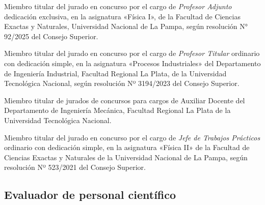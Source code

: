 \begin{timeline}
 Miembro titular del jurado en concurso por el cargo de \textit{Profesor Adjunto} dedicación exclusiva, en la asignatura «Física I», de la Facultad de Ciencias Exactas y Naturales, Universidad Nacional de La Pampa, según resolución N° 92/2025 del Consejo Superior.

 Miembro titular del jurado en concurso por el cargo de \textit{Profesor Titular} ordinario con dedicación simple, en la asignatura «Procesos Industriales» del Departamento de Ingeniería Industrial, Facultad Regional La Plata, de la Universidad Tecnológica Nacional, según resolución Nº 3194/2023 del Consejo Superior.

 Miembro titular de jurados de concursos para cargos de Auxiliar Docente del Departamento de Ingeniería Mecánica, Facultad Regional La Plata de la Universidad Tecnológica Nacional.

 Miembro titular del jurado en concurso por el cargo de \textit{Jefe de Trabajos Prácticos} ordinario con dedicación simple, en la asignatura «Física II» de la Facultad de Ciencias Exactas y Naturales de la Universidad Nacional de La Pampa, según resolución Nº 523/2021 del Consejo Superior.
\end{timeline}

\subsection{Evaluador de personal científico}

